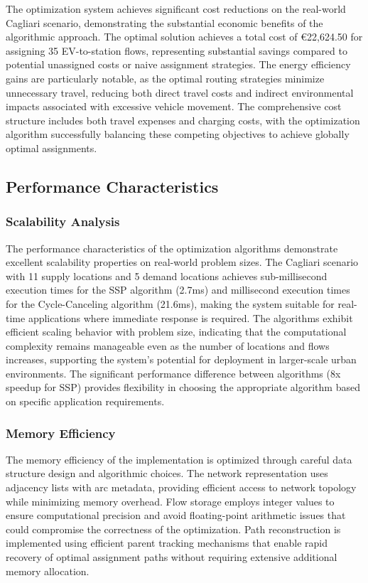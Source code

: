 \documentclass[12pt,a4paper]{article}
\begin{document}
The optimization system achieves significant cost reductions on the real-world Cagliari scenario, demonstrating the substantial economic benefits of the algorithmic approach. The optimal solution achieves a total cost of €22,624.50 for assigning 35 EV-to-station flows, representing substantial savings compared to potential unassigned costs or naive assignment strategies. The energy efficiency gains are particularly notable, as the optimal routing strategies minimize unnecessary travel, reducing both direct travel costs and indirect environmental impacts associated with excessive vehicle movement. The comprehensive cost structure includes both travel expenses and charging costs, with the optimization algorithm successfully balancing these competing objectives to achieve globally optimal assignments.

\subsection{Performance Characteristics}

\subsubsection{Scalability Analysis}

The performance characteristics of the optimization algorithms demonstrate excellent scalability properties on real-world problem sizes. The Cagliari scenario with 11 supply locations and 5 demand locations achieves sub-millisecond execution times for the SSP algorithm (2.7ms) and millisecond execution times for the Cycle-Canceling algorithm (21.6ms), making the system suitable for real-time applications where immediate response is required. The algorithms exhibit efficient scaling behavior with problem size, indicating that the computational complexity remains manageable even as the number of locations and flows increases, supporting the system's potential for deployment in larger-scale urban environments. The significant performance difference between algorithms (8x speedup for SSP) provides flexibility in choosing the appropriate algorithm based on specific application requirements.

\subsubsection{Memory Efficiency}

The memory efficiency of the implementation is optimized through careful data structure design and algorithmic choices. The network representation uses adjacency lists with arc metadata, providing efficient access to network topology while minimizing memory overhead. Flow storage employs integer values to ensure computational precision and avoid floating-point arithmetic issues that could compromise the correctness of the optimization. Path reconstruction is implemented using efficient parent tracking mechanisms that enable rapid recovery of optimal assignment paths without requiring extensive additional memory allocation.
\end{document}
